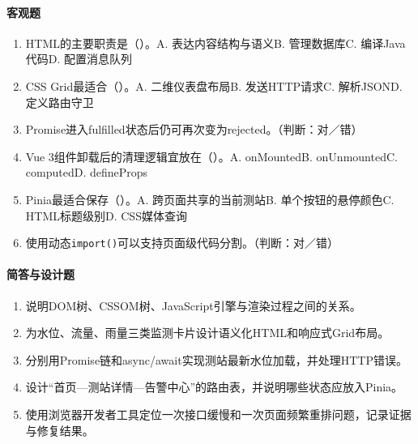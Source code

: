 \paragraph{客观题}
\begin{enumerate}
\item HTML的主要职责是（\quad）。A. 表达内容结构与语义\quad B. 管理数据库\quad C. 编译Java代码\quad D. 配置消息队列
\item CSS Grid最适合（\quad）。A. 二维仪表盘布局\quad B. 发送HTTP请求\quad C. 解析JSON\quad D. 定义路由守卫
\item Promise进入fulfilled状态后仍可再次变为rejected。（判断：对／错）
\item Vue 3组件卸载后的清理逻辑宜放在（\quad）。A. onMounted\quad B. onUnmounted\quad C. computed\quad D. defineProps
\item Pinia最适合保存（\quad）。A. 跨页面共享的当前测站\quad B. 单个按钮的悬停颜色\quad C. HTML标题级别\quad D. CSS媒体查询
\item 使用动态\texttt{import()}可以支持页面级代码分割。（判断：对／错）

\end{enumerate}

\paragraph{简答与设计题}
\begin{enumerate}[resume]
\item 说明DOM树、CSSOM树、JavaScript引擎与渲染过程之间的关系。
\item 为水位、流量、雨量三类监测卡片设计语义化HTML和响应式Grid布局。
\item 分别用Promise链和async/await实现测站最新水位加载，并处理HTTP错误。
\item 设计“首页—测站详情—告警中心”的路由表，并说明哪些状态应放入Pinia。
\item 使用浏览器开发者工具定位一次接口缓慢和一次页面频繁重排问题，记录证据与修复结果。
\end{enumerate}
